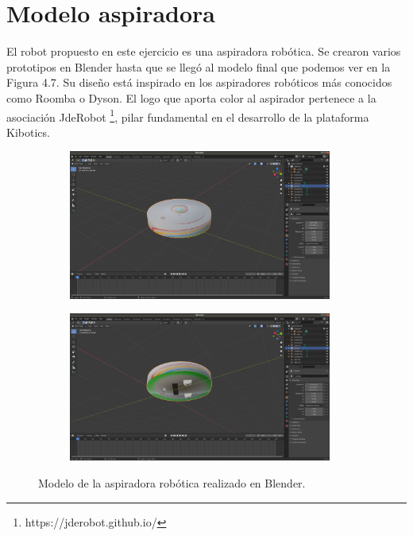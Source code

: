 \section{Modelo aspiradora}

El robot  propuesto en este ejercicio es una aspiradora robótica. Se crearon varios prototipos en Blender  hasta que se llegó al modelo final que podemos ver en la Figura 4.7. Su diseño está inspirado en los aspiradores robóticos más conocidos como Roomba o Dyson. El logo que aporta color al aspirador pertenece a la asociación JdeRobot \footnote{https://jderobot.github.io/}, pilar fundamental en el desarrollo de la plataforma Kibotics.
 
 \begin{figure}[H]
  \begin{subfigure}[b]{0.5\textwidth}
  \centering
    \includegraphics[width=0.95\textwidth, height=0.7\textwidth]{chapters/images/roombablender.png}
    \caption{}
    \label{fig:f1}
  \end{subfigure}
  \hfill
  \begin{subfigure}[b]{0.5\textwidth}
  \centering
    \includegraphics[width=0.95\textwidth, height=0.7\textwidth]{chapters/images/roombablender2.png}
	\caption{}    
    \label{fig:f2}
 
  \end{subfigure}
  \caption{Modelo de la aspiradora robótica  realizado en Blender.}
\end{figure}

